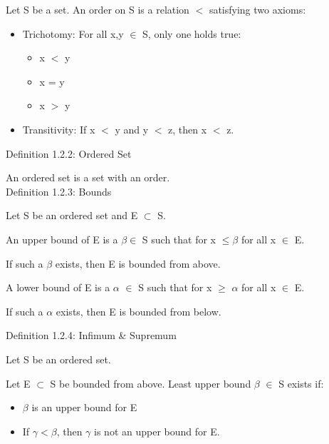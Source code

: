 	\hspace{1cm}
	Let S be a set. An order on S is a relation $<$ satisfying two axioms:

	\begin{itemize}[leftmargin=2cm, itemsep=0.1cm]
		\item { \color{lblue} Trichotomy}: For all x,y $ \in $ S, only one holds true:
			\begin{itemize}[leftmargin=1cm, itemsep=0.1cm]
				\item x $<$ y
				\item x = y
				\item x $>$ y
			\end{itemize}
		\item { \color{lblue} Transitivity}: If x $<$ y and y $<$ z, then x $<$ z. \\
	\end{itemize}

{ \color{blue} Definition 1.2.2: Ordered Set }

	\hspace{1cm}
	An ordered set is a set with an order. \\

{ \color{blue} Definition 1.2.3: Bounds }

	\begin{adjustbox}{minipage=14cm, right, vspace=0.1cm 0cm}
		Let S be an ordered set and E $ \subset $ S.

		An upper bound of E is a $ \beta \in $ S such that for x $ \leq \beta $
		for all x $ \in $ E.

		\hspace{1cm}
		If such a $ \beta $ exists, then E is bounded from above.

		A lower bound of E is a $\alpha$ $\in$ S such that for x $ \geq $ $\alpha$
		for all x $\in$ E.

		\hspace{1cm}
		If such a $\alpha$ exists, then E is bounded from below.
	\end{adjustbox}

\newpage

{ \color{blue} Definition 1.2.4: Infimum \& Supremum}

	\hspace{1cm}
	Let S be an ordered set.

	\hspace{1cm}
	Let E $ \subset $ S be bounded from above.
	Least upper bound $\beta$ $\in$ S exists if:
	
	\begin{itemize}[leftmargin=2cm, itemsep=0.1cm]
		\item $\beta$ is an upper bound for E
	
		\item If $\gamma < \beta$, then $ \gamma $ is not an upper bound for E.
	\end{itemize}

